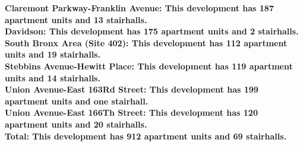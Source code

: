 \bf{Claremont Parkway-Franklin Avenue}: This development has 187 apartment units and 13 stairhalls.\\\bf{Davidson}: This development has 175 apartment units and 2 stairhalls.\\\bf{South Bronx Area (Site 402)}: This development has 112 apartment units and 19 stairhalls.\\\bf{Stebbins Avenue-Hewitt Place}: This development has 119 apartment units and 14 stairhalls.\\\bf{Union Avenue-East 163Rd Street}: This development has 199 apartment units and one stairhall.\\\bf{Union Avenue-East 166Th Street}: This development has 120 apartment units and 20 stairhalls.\\\bf{Total}: This development has 912 apartment units and 69 stairhalls.\\